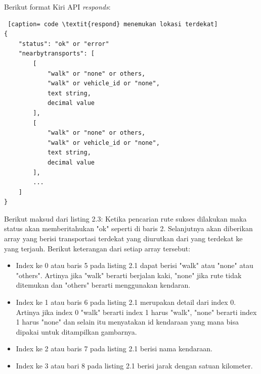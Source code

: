 \vspace{5mm}
Berikut format Kiri API \textit{responds}:

\begin{lstlisting} [caption= code \textit{respond} menemukan lokasi terdekat]
{
    "status": "ok" or "error"
    "nearbytransports": [
        [
            "walk" or "none" or others,
            "walk" or vehicle_id or "none",
            text string,
            decimal value
        ],
        [
            "walk" or "none" or others,
            "walk" or vehicle_id or "none",
            text string,
            decimal value
        ],
        ...     
    ]
}\end{lstlisting}
Berikut maksud dari listing 2.3:
\hspace{0.5cm} Ketika pencarian rute sukses dilakukan maka status akan memberitahukan "ok" seperti di baris 2. Selanjutnya akan diberikan array yang berisi transportasi terdekat yang diurutkan dari yang terdekat ke yang terjauh. Berikut keterangan dari setiap array tersebut: 
\begin{itemize}
	\item Index ke 0 atau baris 5 pada listing 2.1 dapat berisi "walk" atau "none" atau "others". Artinya  jika "walk" berarti berjalan kaki, "none" jika rute tidak ditemukan dan "others" berarti menggunakan kendaran.
	\item Index ke 1 atau baris 6 pada listing 2.1 merupakan detail dari index 0. Artinya jika index 0 "walk" berarti index 1 harus "walk", "none" berarti index 1 harus "none" dan selain itu menyatakan id kendaraan yang mana bisa dipakai untuk ditampilkan gambarnya.
	\item Index ke 2 atau baris 7 pada listing 2.1 berisi nama kendaraan.
	\item Index ke 3 atau bari 8 pada listing 2.1 berisi jarak dengan satuan kilometer.
\end{itemize}